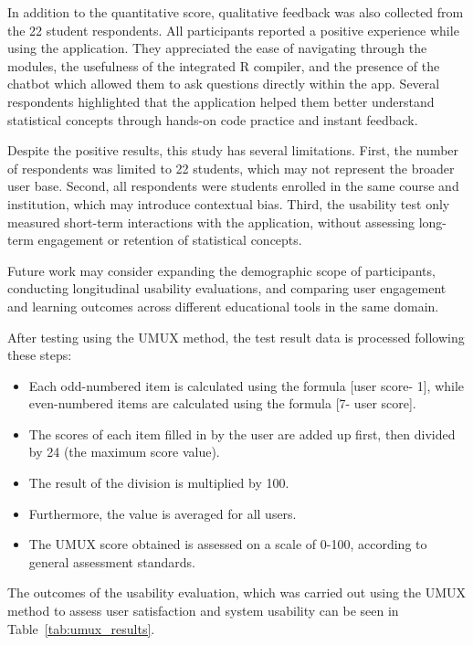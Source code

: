 \documentclass[conference,a4paper]{IEEEtran}
\begin{document}
\begin{enumerate}[label=\alph*.]
  In addition to the quantitative score, qualitative feedback was also collected from the 22 student respondents. All participants reported a positive experience while using the application. They appreciated the ease of navigating through the modules, the usefulness of the integrated R compiler, and the presence of the chatbot which allowed them to ask questions directly within the app. Several respondents highlighted that the application helped them better understand statistical concepts through hands-on code practice and instant feedback.

	Despite the positive results, this study has several limitations. First, the number of respondents was limited to 22 students, which may not represent the broader user base. Second, all respondents were students enrolled in the same course and institution, which may introduce contextual bias. Third, the usability test only measured short-term interactions with the application, without assessing long-term engagement or retention of statistical concepts.

  Future work may consider expanding the demographic scope of participants, conducting longitudinal usability evaluations, and comparing user engagement and learning outcomes across different educational tools in the same domain.

\end{enumerate}

After testing using the UMUX method, the test result data is processed following these steps:
\begin{itemize}
  \item Each odd-numbered item is calculated using the formula [user score- 1], while even-numbered items are calculated using the formula [7- user score].
  \item The scores of each item filled in by the user are added up first, then divided by 24 (the maximum score value).
  \item The result of the division is multiplied by 100.
  \item Furthermore, the value is averaged for all users.
  \item The UMUX score obtained is assessed on a scale of 0-100, according to general assessment standards\cite{b27}.
\end{itemize}
 
The outcomes of the usability evaluation, which was carried out using the UMUX method to assess user satisfaction and system usability can be seen in Table~\ref{tab:umux_results}.
\end{document}
